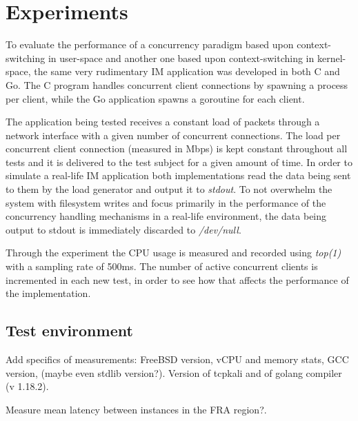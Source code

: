 \section{Experiments}
To evaluate the performance of a concurrency paradigm based upon context-switching in user-space and another one based upon context-switching in kernel-space, the same very rudimentary IM application was developed in both C and Go. The C program handles concurrent client connections by spawning a process per client, while the Go application spawns a goroutine for each client. 

The application being tested receives a constant load of packets through a network interface with a given number of concurrent connections. The load per concurrent client connection (measured in Mbps) is kept constant throughout all tests and it is delivered to the test subject for a given amount of time. In order to simulate a real-life IM application both implementations read the data being sent to them by the load generator and output it to \textit{stdout}. To not overwhelm the system with filesystem writes and focus primarily in the performance of the concurrency handling mechanisms in a real-life environment, the data being output to stdout is immediately discarded to \textit{/dev/null}. 

Through the experiment the CPU usage is measured and recorded using \textit{top(1)} with a sampling rate of 500ms. The number of active concurrent clients is incremented in each new test, in order to see how that affects the performance of the implementation.

\subsection{Test environment}


Add specifics of measurements: FreeBSD version, vCPU and memory stats, GCC version, (maybe even stdlib version?). Version of tcpkali and of golang compiler (v 1.18.2). 

Measure mean latency between instances in the FRA region?.